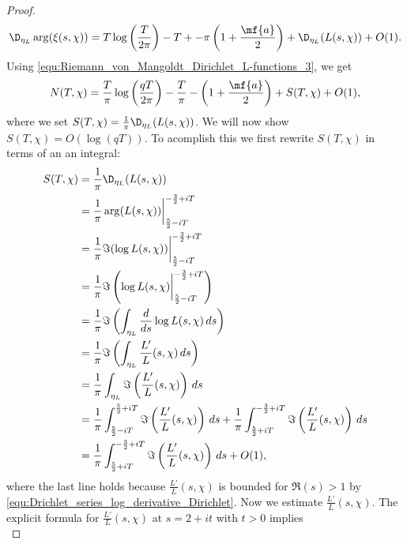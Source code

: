 \begin{proof}
        \[
          \D_{\eta_{L}}\arg(\xi(s,\chi)) = T\log\left(\frac{T}{2\pi}\right)-T+-\pi\left(1+\frac{\mf{a}}{2}\right)+\D_{\eta_{L}}(L(s,\chi))+O(1).
        \]
        Using \cref{equ:Riemann_von_Mangoldt_Dirichlet_L-functions_3}, we get
        \begin{equation}\label{equ:Riemann_von_Mangoldt_Dirichlet_L-functions_7}
          N(T,\chi) = \frac{T}{\pi}\log\left(\frac{qT}{2\pi}\right)-\frac{T}{\pi}-\left(1+\frac{\mf{a}}{2}\right)+S(T,\chi)+O(1),
        \end{equation}
        where we set $S(T,\chi) = \frac{1}{\pi}\D_{\eta_{L}}(L(s,\chi))$. We will now show $S(T,\chi) = O(\log(qT))$. To acomplish this we first rewrite $S(T,\chi)$ in terms of an  an integral:
        \begin{equation}\label{equ:Riemann_von_Mangoldt_Dirichlet_L-functions_8}
          \begin{aligned}
            S(T,\chi) &= \frac{1}{\pi}\D_{\eta_{L}}(L(s,\chi)) \\
            &= \frac{1}{\pi}\arg(L(s,\chi))\bigg|_{\frac{5}{2}-iT}^{-\frac{3}{2}+iT} \\
            &= \frac{1}{\pi}\Im(\log L(s,\chi))\bigg|_{\frac{5}{2}-iT}^{-\frac{3}{2}+iT} \\
            &= \frac{1}{\pi}\Im\left(\log L(s,\chi)\bigg|_{\frac{5}{2}-iT}^{-\frac{3}{2}+iT}\right) \\
            &= \frac{1}{\pi}\Im\left(\int_{\eta_{L}}\frac{d}{ds}\log L(s,\chi)\,ds\right) \\
            &= \frac{1}{\pi}\Im\left(\int_{\eta_{L}}\frac{L'}{L}(s,\chi)\,ds\right) \\
            &= \frac{1}{\pi}\int_{\eta_{L}}\Im\left(\frac{L'}{L}(s,\chi)\right)\,ds \\
            &= \frac{1}{\pi}\int_{\frac{5}{2}-iT}^{\frac{5}{2}+iT}\Im\left(\frac{L'}{L}(s,\chi)\right)\,ds+\frac{1}{\pi}\int_{\frac{5}{2}+iT}^{-\frac{3}{2}+iT}\Im\left(\frac{L'}{L}(s,\chi)\right)\,ds \\
            &= \frac{1}{\pi}\int_{\frac{5}{2}+iT}^{-\frac{3}{2}+iT}\Im\left(\frac{L'}{L}(s,\chi)\right)\,ds+O(1),
          \end{aligned}
        \end{equation}
        where the last line holds because $\frac{L'}{L}(s,\chi)$ is bounded for $\Re(s) > 1$ by \cref{equ:Drichlet_series_log_derivative_Dirichlet}. Now we estimate $\frac{L'}{L}(s,\chi)$. The explicit formula for $\frac{L'}{L}(s,\chi)$ at $s = 2+it$ with $t > 0$ implies
        \begin{equation}\label{equ:Riemann_von_Mangoldt_Dirichlet_L-functions_9}

\end{equation}
\end{proof}
